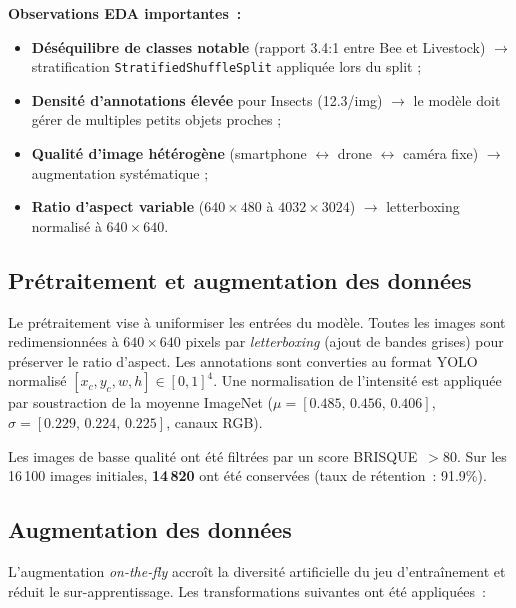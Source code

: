 \textbf{Observations EDA importantes~:}
\begin{itemize}
  \item \textbf{Déséquilibre de classes notable} (rapport 3.4:1 entre Bee et Livestock)
        $\rightarrow$ stratification \texttt{StratifiedShuffleSplit} appliquée lors du split ;
  \item \textbf{Densité d'annotations élevée} pour Insects (12.3/img) $\rightarrow$ le modèle
        doit gérer de multiples petits objets proches ;
  \item \textbf{Qualité d'image hétérogène} (smartphone $\leftrightarrow$ drone $\leftrightarrow$
        caméra fixe) $\rightarrow$ augmentation systématique ;
  \item \textbf{Ratio d'aspect variable} ($640\times480$ à $4032\times3024$)
        $\rightarrow$ letterboxing normalisé à $640\times640$.
\end{itemize}

\subsection{Prétraitement et augmentation des données}

Le prétraitement vise à uniformiser les entrées du modèle. Toutes les images sont
redimensionnées à $640\times640$ pixels par \textit{letterboxing} (ajout de bandes
grises) pour préserver le ratio d'aspect. Les annotations sont converties au format
YOLO normalisé $[x_c, y_c, w, h] \in [0,1]^4$. Une normalisation de l'intensité est
appliquée par soustraction de la moyenne ImageNet
($\mu = [0.485,\,0.456,\,0.406]$, $\sigma = [0.229,\,0.224,\,0.225]$, canaux RGB).

Les images de basse qualité ont été filtrées par un score BRISQUE~$> 80$. Sur les
16\,100 images initiales, \textbf{14\,820} ont été conservées (taux de rétention~: 91.9\%).

\subsection{Augmentation des données}

L'augmentation \textit{on-the-fly} accroît la diversité artificielle du jeu
d'entraînement et réduit le sur-apprentissage. Les transformations suivantes
ont été appliquées~:

